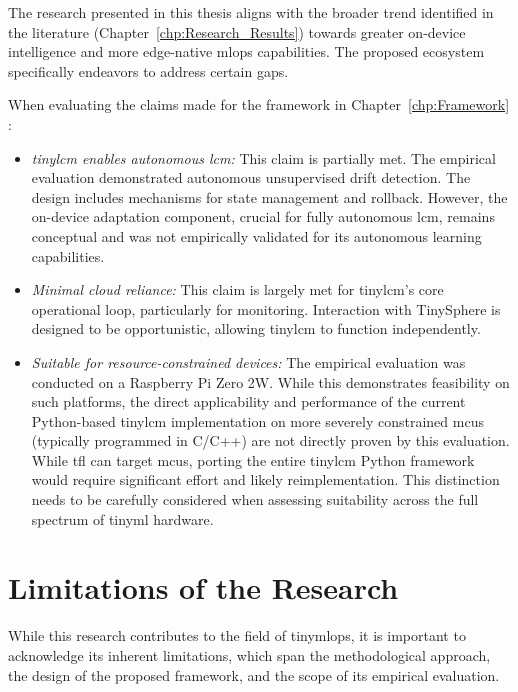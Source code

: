 The research presented in this thesis aligns with the broader trend identified in the literature (Chapter~\ref{chp:Research_Results}) towards greater on-device intelligence and more edge-native \gls{mlops} capabilities. The proposed ecosystem specifically endeavors to address certain gaps.

When evaluating the claims made for the framework in Chapter~\ref{chp:Framework} :

\begin{itemize}
    \item \textit{\gls{tinylcm} enables autonomous \gls{lcm}:} This claim is partially met. The empirical evaluation demonstrated autonomous unsupervised drift detection. The design includes mechanisms for state management and rollback. However, the on-device adaptation component, crucial for fully autonomous \gls{lcm}, remains conceptual and was not empirically validated for its autonomous learning capabilities.
    
    \item \textit{Minimal cloud reliance:} This claim is largely met for \gls{tinylcm}'s core operational loop, particularly for monitoring. Interaction with TinySphere is designed to be opportunistic, allowing \gls{tinylcm} to function independently.
    
    \item \textit{Suitable for resource-constrained devices:} The empirical evaluation was conducted on a Raspberry Pi Zero 2W. While this demonstrates feasibility on such platforms, the direct applicability and performance of the current Python-based \gls{tinylcm} implementation on more severely constrained \gls{mcu}s (typically programmed in C/C++) are not directly proven by this evaluation. While \gls{tfl} can target \gls{mcu}s, porting the entire \gls{tinylcm} Python framework would require significant effort and likely reimplementation. This distinction needs to be carefully considered when assessing suitability across the full spectrum of \gls{tinyml} hardware. 
\end{itemize}

\section{Limitations of the Research}
\label{sec:limitations_research}

While this research contributes to the field of \gls{tinymlops}, it is important to acknowledge its inherent limitations, which span the methodological approach, the design of the proposed framework, and the scope of its empirical evaluation.

